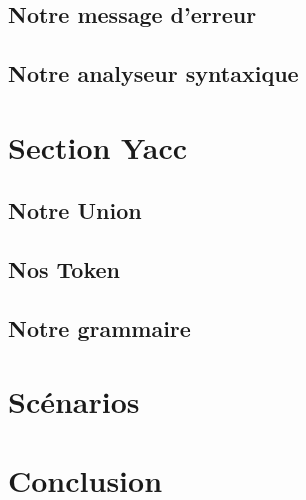 \documentclass[a4paper, 11pt]{report}
\begin{document}
\subsection{Notre message d'erreur}


\subsection{Notre analyseur syntaxique}


\section{Section Yacc}

\subsection{Notre Union}


\subsection{Nos Token}


\subsection{Notre grammaire}



\section{Scénarios}


\section{Conclusion}



\end{document}
